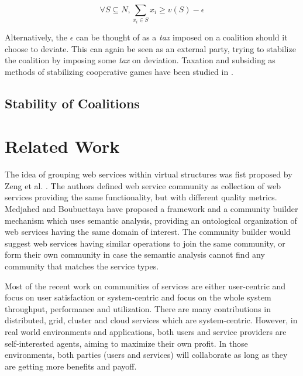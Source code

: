    \begin{equation}\label{eq:core2}
       \forall S \subseteq N, \sum_{x_i \in S} x_i \geq v(S) - \epsilon
   \end{equation}
   
Alternatively, the $\epsilon$ can be thought of as a \emph{tax} imposed on a coalition should it choose to deviate. This can again be seen as an external party, trying to stabilize the coalition by imposing some \emph{tax} on deviation. Taxation and subsiding as methods of stabilizing cooperative games have been studied in \cite{RePEc:spr:jogath:v:38:y:2009:i:1:p:3-16, RePEc:mse:cesdoc:12022r, Bachrach:2009:CSC:1692490.1692502, conf/ijcai/MeirRM11}.

\subsection{Stability of Coalitions}

\section{Related Work}\label{sec:BRRelatedWork}

The idea of grouping web services within virtual structures was
fist proposed by Zeng et al. \cite{Zeng:2003:QDW:775152.775211}.
The authors defined web service community as collection of web
services providing the same functionality, but with different
quality metrics. Medjahed and Boubuettaya
\cite{journals/dpd/MedjahedB05} have proposed a framework and a
community builder mechanism which uses semantic analysis,
providing an ontological organization of web services having the
same domain of interest. The community builder would suggest web
services having similar operations to join the same community, or
form their own community in case the semantic analysis cannot find
any community that matches the service types.

        Most of the recent work on communities of services are either
        user-centric and focus on user satisfaction
        \cite{Chun02user-centricperformance} or system-centric and focus
        on the whole system throughput, performance and utilization. There
        are many contributions in distributed, grid, cluster and cloud
        services which are system-centric. However, in real world
        environments and applications, both users and service providers
        are self-interested agents, aiming to maximize their own profit.
        In those environments, both parties (users and services) will
        collaborate as long as they are getting more benefits and payoff.

